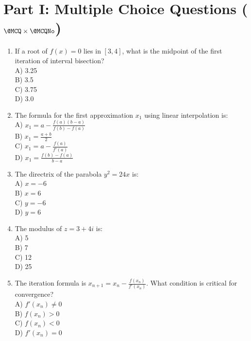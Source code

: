 \documentclass{../Templates/sbs-exam}
\begin{document}
\maketitle

\examnotice

\makemarksheet

\examtools

\newpage

\makeatletter
\section*{Part I: Multiple Choice Questions ($ \@MCQ \times \@MCQNo $)}
\makeatother
\begin{enumerate}
\item 
If a root of $ f(x) = 0 $ lies in $[3, 4]$, what is the midpoint of the first iteration of interval bisection?\\
A) 3.25\\
B) 3.5\\
C) 3.75\\
D) 3.0

\item 
The formula for the first approximation $ x_1 $ using linear interpolation is:\\
A) $ x_1 = a - \frac{f(a)(b-a)}{f(b)-f(a)} $\\
B) $ x_1 = \frac{a + b}{2} $\\
C) $ x_1 = a - \frac{f(a)}{f'(a)} $\\
D) $ x_1 = \frac{f(b) - f(a)}{b - a} $

\item 
The directrix of the parabola $ y^2 = 24x $ is:\\
A) $ x = -6 $\\
B) $ x = 6 $\\
C) $ y = -6 $\\
D) $ y = 6 $

\item  
The modulus of $ z = 3 + 4i $ is:\\
A) 5\\
B) 7\\
C) 12\\
D) 25

\item 
The iteration formula is $ x_{n+1} = x_n - \frac{f(x_n)}{f'(x_n)} $. What condition is critical for convergence?\\
A) $ f'(x_n) \neq 0 $\\
B) $ f(x_n) > 0 $\\
C) $ f(x_n) < 0 $\\
D) $ f'(x_n) = 0 $


\end{enumerate}
\end{document}
